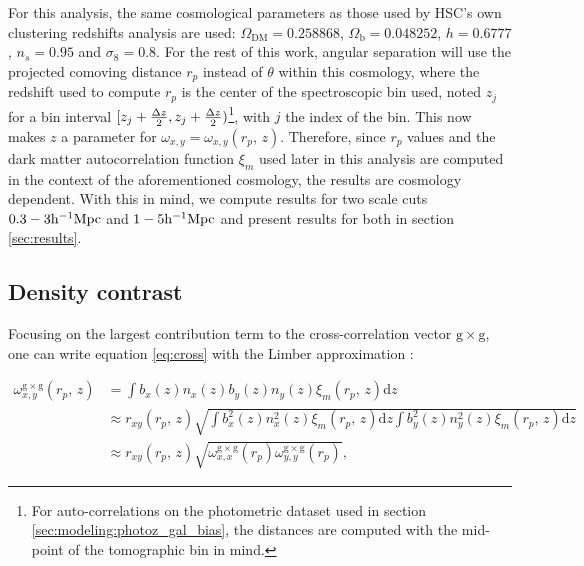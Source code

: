 For this analysis, the same cosmological parameters as those used by HSC's own clustering redshifts analysis \cite{HSCClusteringRau2023} are used: $\Omega_{\mathrm{DM}}=0.258868$, $\Omega_{\mathrm{b}}=0.048252$, $h=0.6777$, $n_s=0.95$ and $\sigma_8=0.8$\label{cosmology}. For the rest of this work, angular separation will use the projected comoving distance $r_p$ instead of $\theta$ within this cosmology, where the redshift used to compute $r_p$ is the center of the spectroscopic bin used, noted $z_j$ for a bin interval $[z_j+\frac{\Delta z}{2},z_j+\frac{\Delta z}{2})$\footnote{For auto-correlations on the photometric dataset used in section \ref{sec:modeling:photoz_gal_bias}, the distances are computed with the mid-point of the tomographic bin in mind.}, with $j$ the index of the bin. This now makes $z$ a parameter for $\omega_{x,y}=\omega_{x,y}(r_p,\,z)$. Therefore, since $r_p$ values and the dark matter autocorrelation function $\xi_m$ used later in this analysis are computed in the context of the aforementioned cosmology, the results are cosmology dependent. With this in mind, we compute results for two scale cuts $0.3-3\mathrm{h}^{-1}\mathrm{Mpc}$ and $1-5\mathrm{h}^{-1}\mathrm{Mpc}$ and present results for both in section \ref{sec:results}.

\subsection{Density contrast}

Focusing on the largest contribution term to the cross-correlation vector $\mathrm{g} \times \mathrm{g}$, one can write equation \ref{eq:cross}\cite{Cawthon2022DESY3Boss} with the Limber approximation \cite{Limber1953Approximation}:

\begin{align}\label{eq:cross}
    \omega_{x,y}^{\mathrm{g}\times\mathrm{g}}(r_p,\,z)
    &=\int b_x(z)n_x(z)b_y(z)n_y(z)\xi_m(r_p,\,z)\mathrm{d}z\nonumber\\   
    &\approx r_{xy}(r_p,\,z)\sqrt{\int b_x^2(z)n_x^2(z)\xi_m(r_p,\,z)\mathrm{d}z\int b_y^2(z)n_y^2(z)\xi_m(r_p,\,z)\mathrm{d}z}\nonumber\\
    &\approx r_{xy}(r_p,\,z)\sqrt{\omega_{x,x}^{\mathrm{g}\times\mathrm{g}}(r_p)\omega_{y,y}^{\mathrm{g}\times\mathrm{g}}(r_p)},
\end{align}

